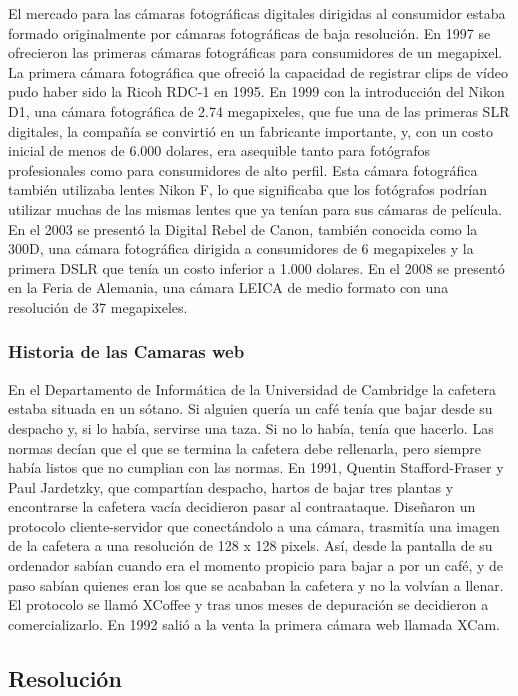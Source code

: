 \documentclass[12pt,a4paper]{report}
\begin{document}
El mercado para las cámaras fotográficas digitales dirigidas al consumidor
estaba formado originalmente por cámaras fotográficas de baja resolución. En
1997 se ofrecieron las primeras cámaras fotográficas para consumidores de un
megapixel. La primera cámara fotográfica que ofreció la capacidad de registrar
clips de vídeo pudo haber sido la Ricoh RDC-1 en 1995.
En 1999 con la introducción del Nikon D1, una cámara fotográfica de 2.74
megapixeles, que fue una de las primeras SLR digitales, la compañía se convirtió
en un fabricante importante, y, con un costo inicial de menos de 6.000 dolares,
era asequible tanto para fotógrafos profesionales como para consumidores de alto
perfil. Esta cámara fotográfica también utilizaba lentes Nikon F, lo que
significaba que los fotógrafos podrían utilizar muchas de las mismas lentes que
ya tenían para sus cámaras de película.
En el 2003 se presentó la Digital Rebel de Canon, también conocida como la 300D,
una cámara fotográfica dirigida a consumidores de 6 megapixeles y la primera
DSLR que tenía un costo inferior a 1.000 dolares.
En el 2008 se presentó en la Feria de Alemania, una cámara LEICA de medio
formato con una resolución de 37 megapixeles.

\subsubsection{Historia de las Camaras web}

En el Departamento de Informática de la Universidad de Cambridge la cafetera
estaba situada en un sótano. Si alguien quería un café tenía que bajar desde su
despacho y, si lo había, servirse una taza. Si no lo había, tenía que hacerlo.
Las normas decían que el que se termina la cafetera debe rellenarla, pero
siempre había listos que no cumplian con las normas.
En 1991, Quentin Stafford-Fraser y Paul Jardetzky, que compartían despacho,
hartos de bajar tres plantas y encontrarse la cafetera vacía decidieron pasar al
contraataque. Diseñaron un protocolo cliente-servidor que conectándolo a una
cámara, trasmitía una imagen de la cafetera a una resolución de 128 x 128
pixels.
Así, desde la pantalla de su ordenador sabían cuando era el momento propicio
para bajar a por un café, y de paso sabían quienes eran los que se acababan la
cafetera y no la volvían a llenar. El protocolo se llamó XCoffee y tras unos
meses de depuración se decidieron a comercializarlo. En 1992 salió a la venta la
primera cámara web llamada XCam.

\subsection{Resolución}
\end{document}
